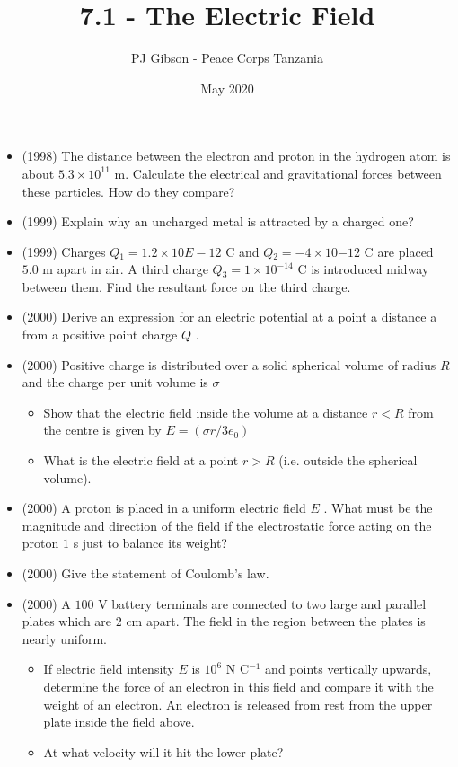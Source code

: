 \documentclass{article}
\title{\textbf{7.1 - The Electric Field}}
\author{PJ Gibson - Peace Corps Tanzania}
\date{May 2020}
\begin{document}
\maketitle

\begin{itemize}
\item (1998)  The distance between the electron and proton in the hydrogen atom is about $ 5.3 \times 10^{11}$ m. Calculate the electrical and gravitational forces between these particles. How do they compare?
\item (1999)  Explain why an uncharged metal is attracted by a charged one?
\item (1999)  Charges $ Q​_{1}=1.2 \times 10$ ​$ E-12$ C and $ Q​_{2}=-4 \times 10$ ​ $ -12$ C are placed $ 5.0$ m apart in air. A third charge $ Q​_{3}=1 \times 10^{-14}$ C is introduced midway between them. Find the resultant force on the third charge.
\item (2000)  Derive an expression for an electric potential at a point a distance a from a positive point charge $ Q$ .
\item (2000)  Positive charge is distributed over a solid spherical volume of radius $ R$ and the charge per unit volume is $ \sigma $
 \begin{itemize}
\item Show that the electric field inside the volume at a distance $ r<R$ from the centre is given by $ E=(\sigma r/3e_{0})$
\item What is the electric field at a point $ r>R$ (i.e. outside the spherical volume).
\end{itemize}
\item (2000)  A proton is placed in a uniform electric field $ E$ . What must be the magnitude and direction of the field if the electrostatic force acting on the proton $ 1$ s just to balance its weight?
\item (2000)  Give the statement of Coulomb’s law.
\item (2000)  A $ 100$ V battery terminals are connected to two large and parallel plates which are $ 2$ cm apart. The field in the region between the plates is nearly uniform. 
 \begin{itemize}
\item If electric field intensity $ E$ is $ 10^{6}$ N C$ ^{-1}$ and points vertically upwards, determine the force of an electron in this field and compare it with the weight of an electron. An electron is released from rest from the upper plate inside the field above.
\item At what velocity will it hit the lower plate?

\end{itemize}
\end{itemize}
\end{document}
